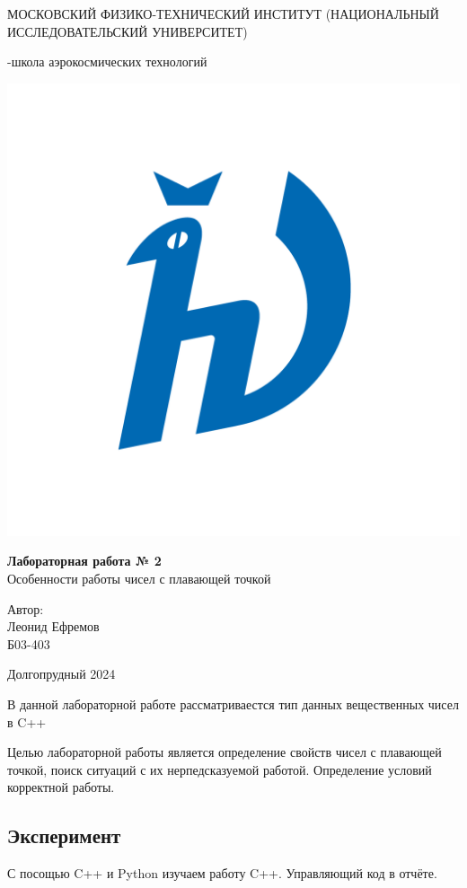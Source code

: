 \documentclass[a4paper,12pt]{article} %
\begin{document}
\begin{titlepage}
\begin{center}
    {\large МОСКОВСКИЙ ФИЗИКО-ТЕХНИЧЕСКИЙ ИНСТИТУТ (НАЦИОНАЛЬНЫЙ ИССЛЕДОВАТЕЛЬСКИЙ УНИВЕРСИТЕТ)}
\end{center}
\begin{center}
    {-школа аэрокосмических технологий}
\end{center}

\vspace{3.5cm}

\begin{center}
    \includegraphics[width=0.4\linewidth]{hv_full.png}
\end{center}
\vspace{0.1cm}
{\huge
\begin{center}
    {\bf Лабораторная работа № 2}\\
    Особенности работы чисел с плавающей точкой
\end{center}
}
\vspace{0.5cm}
\begin{flushright}
{\LARGE Автор:\\ 
Леонид Ефремов \\ 
\vspace{0.2cm}
Б03-403}
\end{flushright}
\vspace{3.5cm}
\begin{center}
    Долгопрудный 2024
\end{center}
\end{titlepage}

\tableofcontents
В данной лабораторной работе рассматриваестся тип данных вещественных чисел в C++\par
Целью лабораторной работы является определение свойств чисел с плавающей точкой, поиск ситуаций с их нерпедсказуемой работой. Определение условий корректной работы. 
\subsection{Эксперимент}
С посощью C++ и Python изучаем работу C++. Управляющий код в отчёте.
\end{document}
